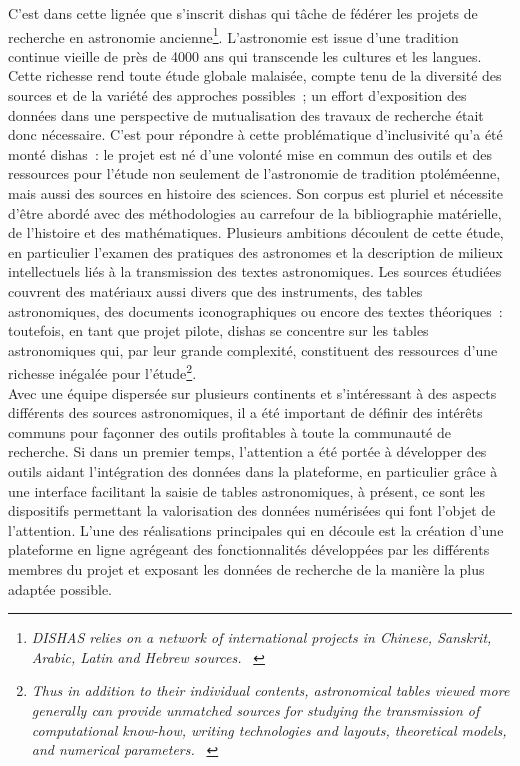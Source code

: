 \documentclass[a4paper,12pt,twoside]{book}
\newcommand{\eng}{\emph}
\newcommand{\g}[1]{\og#1~\fg}
\newcommand{\dishas}{\gls{dishas}\xspace}
\begin{document}
C'est dans cette lignée que s'inscrit \dishas qui tâche de fédérer les projets de recherche en astronomie ancienne\footnote{\g{\eng{DISHAS relies on a network of international projects in Chinese, Sanskrit, Arabic, Latin and Hebrew sources.}} \cite{DISHASProjectAstronomical}}. L'astronomie est issue d'une tradition continue vieille de près de 4000 ans qui transcende les cultures et les langues. Cette richesse rend toute étude globale malaisée, compte tenu de la diversité des sources et de la variété des approches possibles~; un effort d'exposition des données dans une perspective de mutualisation des travaux de recherche était donc nécessaire. C'est pour répondre à cette problématique d'inclusivité qu'a été monté \dishas~: le projet est né d'une volonté mise en commun des outils et des ressources pour l'étude non seulement de l'astronomie de tradition ptoléméenne, mais aussi des sources en histoire des sciences. Son corpus est pluriel et nécessite d'être abordé avec des méthodologies au carrefour de la bibliographie matérielle, de l'histoire et des mathématiques. Plusieurs ambitions découlent de cette étude, en particulier l'examen des pratiques des astronomes et la description de milieux intellectuels liés à la transmission des textes astronomiques. Les sources étudiées couvrent des matériaux aussi divers que des instruments, des tables astronomiques, des documents iconographiques ou encore des textes théoriques~: toutefois, en tant que projet pilote, \dishas se concentre sur les tables astronomiques qui, par leur grande complexité, constituent des ressources d'une richesse inégalée pour l'étude\footnote{\g{\eng{Thus in addition to their individual contents, astronomical tables viewed more generally can provide unmatched sources for studying the transmission of computational know-how, writing technologies and layouts, theoretical models, and numerical parameters.}} \cite{DISHASProjectAstronomical}}.\\

Avec une équipe dispersée sur plusieurs continents et s'intéressant à des aspects différents des sources astronomiques, il a été important de définir des intérêts communs pour façonner des outils profitables à toute la communauté de recherche. Si dans un premier temps, l'attention a été portée à développer des outils aidant l'intégration des données dans la plateforme, en particulier grâce à une interface facilitant la saisie de tables astronomiques, à présent, ce sont les dispositifs permettant la valorisation des données numérisées qui font l'objet de l'attention. L'une des réalisations principales qui en découle est la création d'une plateforme en ligne agrégeant des fonctionnalités développées par les différents membres du projet et exposant les données de recherche de la manière la plus adaptée possible.\\
\end{document}

